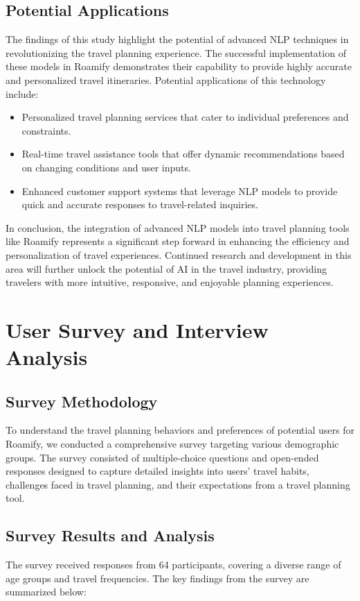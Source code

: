 \documentclass[conference]{IEEEtran}
\begin{document}
\subsection{Potential Applications}

The findings of this study highlight the potential of advanced NLP techniques in revolutionizing the travel planning experience. The successful implementation of these models in Roamify demonstrates their capability to provide highly accurate and personalized travel itineraries. Potential applications of this technology include:
\begin{itemize}
    \item Personalized travel planning services that cater to individual preferences and constraints.
    \item Real-time travel assistance tools that offer dynamic recommendations based on changing conditions and user inputs.
    \item Enhanced customer support systems that leverage NLP models to provide quick and accurate responses to travel-related inquiries.
\end{itemize}

In conclusion, the integration of advanced NLP models into travel planning tools like Roamify represents a significant step forward in enhancing the efficiency and personalization of travel experiences. Continued research and development in this area will further unlock the potential of AI in the travel industry, providing travelers with more intuitive, responsive, and enjoyable planning experiences.

\section{User Survey and Interview Analysis}

\subsection{Survey Methodology}
To understand the travel planning behaviors and preferences of potential users for Roamify, we conducted a comprehensive survey targeting various demographic groups. The survey consisted of multiple-choice questions and open-ended responses designed to capture detailed insights into users' travel habits, challenges faced in travel planning, and their expectations from a travel planning tool.

\subsection{Survey Results and Analysis}
The survey received responses from 64 participants, covering a diverse range of age groups and travel frequencies. The key findings from the survey are summarized below:
\end{document}
